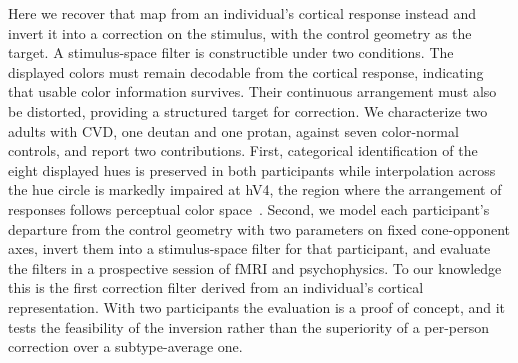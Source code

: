 Here we recover that map from an individual's cortical response instead and invert it into a correction on the stimulus, with the control geometry as the target. A stimulus-space filter is constructible under two conditions. The displayed colors must remain decodable from the cortical response, indicating that usable color information survives. Their continuous arrangement must also be distorted, providing a structured target for correction. We characterize two adults with CVD, one deutan and one protan, against seven color-normal controls, and report two contributions. First, categorical identification of the eight displayed hues is preserved in both participants while interpolation across the hue circle is markedly impaired at hV4, the region where the arrangement of responses follows perceptual color space~\citep{brouwer2009}. Second, we model each participant's departure from the control geometry with two parameters on fixed cone-opponent axes, invert them into a stimulus-space filter for that participant, and evaluate the filters in a prospective session of fMRI and psychophysics. To our knowledge this is the first correction filter derived from an individual's cortical representation. With two participants the evaluation is a proof of concept, and it tests the feasibility of the inversion rather than the superiority of a per-person correction over a subtype-average one.
